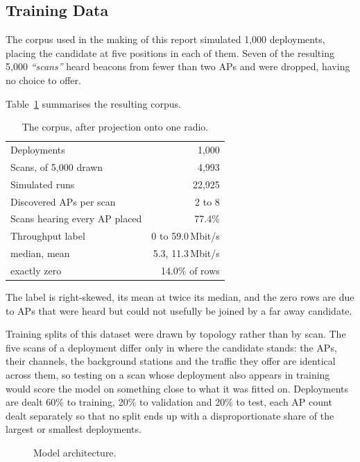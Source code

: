\documentclass[conference]{IEEEtran}
\begin{document}
\subsection{Training Data}

The corpus used in the making of this report simulated 1{,}000 deployments,  
placing the candidate at five positions in each of them. Seven of the resulting 
5{,}000 \textit{``scans''} heard beacons from fewer than two APs and were dropped, 
having no choice to offer.

Table~\ref{tab:corpus} summarises the resulting corpus.

\begin{table}[ht]
\caption{The corpus, after projection onto one radio.}
\label{tab:corpus}
\centering
\footnotesize
\begin{tabularx}{\columnwidth}{@{}Xr@{}}
\toprule
Deployments & 1{,}000 \\
Scans, of 5{,}000 drawn & 4{,}993 \\
Simulated runs & 22{,}925 \\
\addlinespace
Discovered APs per scan & 2 to 8 \\
Scans hearing every AP placed & 77.4\% \\
\addlinespace
Throughput label & 0 to 59.0\,Mbit/s \\
\quad median, mean & 5.3, 11.3\,Mbit/s \\
\quad exactly zero & 14.0\% of rows \\
\bottomrule
\end{tabularx}
\end{table}

The label is right-skewed, its mean at twice its median, and the zero rows are
due to APs that were heard but could not usefully be joined by a far away candidate.

Training splits of this dataset were drawn by topology rather than by scan. 
The five scans of a deployment differ only in where the candidate stands: 
the APs, their channels, the background stations and the traffic they offer 
are identical across them, so testing on a scan whose deployment also appears 
in training would score the model on something close to what it was fitted on. 
Deployments are dealt 60\% to training, 20\% to validation and 20\% to test, 
each AP count dealt separately so that no split ends up with a disproportionate share 
of the largest or smallest deployments.

\begin{figure}[!t]
  \centering
  
  \caption{Model architecture.}
  \label{fig:arch}
\end{figure}
\end{document}
